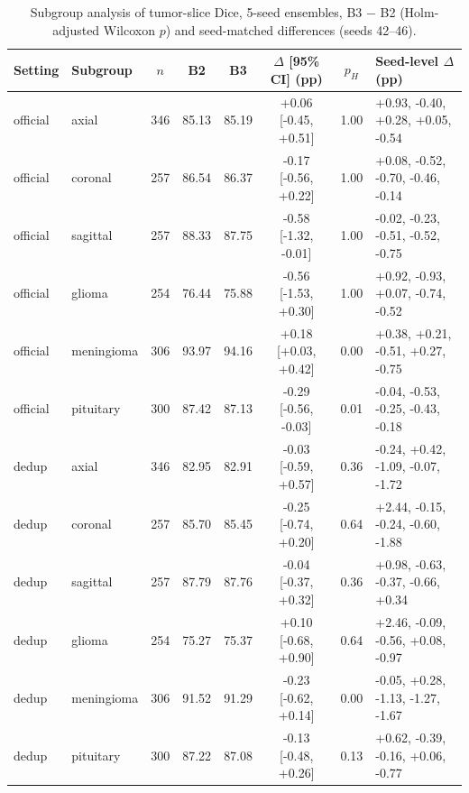 \begin{table}[!ht]
\centering
\scriptsize
\caption{Subgroup analysis of tumor-slice Dice, 5-seed ensembles, B3 $-$ B2 (Holm-adjusted Wilcoxon $p$) and seed-matched differences (seeds 42--46).}
\label{tab:s-subgroups}
\begin{tabular}{llcccccl}
\toprule
Setting & Subgroup & $n$ & B2 & B3 & $\Delta$ [95\% CI] (pp) & $p_H$ & Seed-level $\Delta$ (pp) \\
\midrule
official & axial & 346 & 85.13 & 85.19 & +0.06 [-0.45, +0.51] & 1.00 & +0.93, -0.40, +0.28, +0.05, -0.54 \\
official & coronal & 257 & 86.54 & 86.37 & -0.17 [-0.56, +0.22] & 1.00 & +0.08, -0.52, -0.70, -0.46, -0.14 \\
official & sagittal & 257 & 88.33 & 87.75 & -0.58 [-1.32, -0.01] & 1.00 & -0.02, -0.23, -0.51, -0.52, -0.75 \\
official & glioma & 254 & 76.44 & 75.88 & -0.56 [-1.53, +0.30] & 1.00 & +0.92, -0.93, +0.07, -0.74, -0.52 \\
official & meningioma & 306 & 93.97 & 94.16 & +0.18 [+0.03, +0.42] & 0.00 & +0.38, +0.21, -0.51, +0.27, -0.75 \\
official & pituitary & 300 & 87.42 & 87.13 & -0.29 [-0.56, -0.03] & 0.01 & -0.04, -0.53, -0.25, -0.43, -0.18 \\
dedup & axial & 346 & 82.95 & 82.91 & -0.03 [-0.59, +0.57] & 0.36 & -0.24, +0.42, -1.09, -0.07, -1.72 \\
dedup & coronal & 257 & 85.70 & 85.45 & -0.25 [-0.74, +0.20] & 0.64 & +2.44, -0.15, -0.24, -0.60, -1.88 \\
dedup & sagittal & 257 & 87.79 & 87.76 & -0.04 [-0.37, +0.32] & 0.36 & +0.98, -0.63, -0.37, -0.66, +0.34 \\
dedup & glioma & 254 & 75.27 & 75.37 & +0.10 [-0.68, +0.90] & 0.64 & +2.46, -0.09, -0.56, +0.08, -0.97 \\
dedup & meningioma & 306 & 91.52 & 91.29 & -0.23 [-0.62, +0.14] & 0.00 & -0.05, +0.28, -1.13, -1.27, -1.67 \\
dedup & pituitary & 300 & 87.22 & 87.08 & -0.13 [-0.48, +0.26] & 0.13 & +0.62, -0.39, -0.16, +0.06, -0.77 \\
\bottomrule
\end{tabular}
\end{table}

